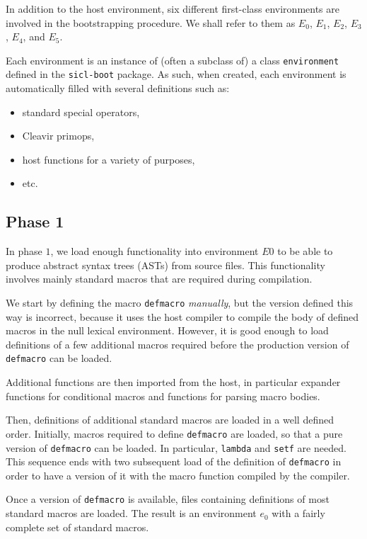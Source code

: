 In addition to the host environment, six different \sysname{}
first-class environments are involved in the bootstrapping procedure.
We shall refer to them as $E_0$, $E_1$, $E_2$, $E_3$, $E_4$, and $E_5$.

Each environment is an instance of (often a subclass of) a class
\texttt{environment} defined in the \texttt{sicl-boot} package.  As
such, when created, each environment is automatically filled with
several definitions such as:

\begin{itemize}
\item standard special operators,
\item Cleavir primops,
\item host functions for a variety of purposes,
\item etc.
\end{itemize}

\subsection{Phase 1}

In phase $1$, we load enough functionality into environment $E0$ to be
able to produce abstract syntax trees (ASTs) from source files.  This
functionality involves mainly standard macros that are required during
compilation.

We start by defining the macro \texttt{defmacro} \emph{manually}, but
the version defined this way is incorrect, because it uses the host
compiler to compile the body of defined macros in the null lexical
environment.  However, it is good enough to load definitions of
a few additional macros required before the production version of
\texttt{defmacro} can be loaded.

Additional functions are then imported from the host, in particular
expander functions for conditional macros and functions for parsing
macro bodies.

Then, definitions of additional standard macros are loaded in a well
defined order.  Initially, macros required to define \texttt{defmacro}
are loaded, so that a pure \sysname{} version of \texttt{defmacro} can
be loaded.  In particular, \texttt{lambda} and \texttt{setf} are
needed.  This sequence ends with two subsequent load of the \sysname{}
definition of \texttt{defmacro} in order to have a version of it with
the macro function compiled by the \sysname{} compiler.

Once a \sysname{} version of \texttt{defmacro} is available, files
containing definitions of most standard macros are loaded.  The result
is an environment $e_0$ with a fairly complete set of standard
macros.

